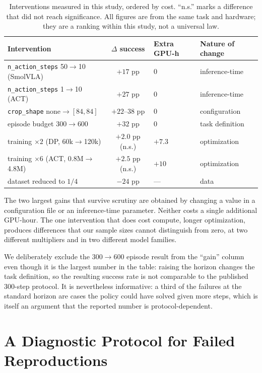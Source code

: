 \documentclass[11pt]{article}
\begin{document}
\begin{table}[t]
\centering
\caption{Interventions measured in this study, ordered by cost. ``n.s.'' marks a
difference that did not reach significance. All figures are from the same task and
hardware; they are a ranking within this study, not a universal law.}
\label{tab:cost}
\begin{tabular}{p{6.2cm}cp{2.2cm}p{3.0cm}}
\toprule
Intervention & $\Delta$ success & Extra GPU-h & Nature of change \\
\midrule
\texttt{n\_action\_steps} 50$\rightarrow$10 (SmolVLA) & $+17$ pp & 0 & inference-time \\
\texttt{n\_action\_steps} 1$\rightarrow$10 (ACT)      & $+27$ pp & 0 & inference-time \\
\texttt{crop\_shape} none$\rightarrow[84,84]$         & $+22$--$38$ pp & 0 & configuration \\
episode budget 300$\rightarrow$600                     & $+32$ pp & 0 & task definition \\
\midrule
training $\times2$ (DP, 60k$\rightarrow$120k)          & $+2.0$ pp (n.s.) & $+7.3$ & optimization \\
training $\times6$ (ACT, 0.8M$\rightarrow$4.8M)        & $+2.5$ pp (n.s.) & $+10$ & optimization \\
\midrule
dataset reduced to $1/4$                               & $-24$ pp & --- & data \\
\bottomrule
\end{tabular}
\end{table}

The two largest gains that survive scrutiny are obtained by changing a value in a
configuration file or an inference-time parameter. Neither costs a single
additional GPU-hour. The one intervention that does cost compute, longer
optimization, produces differences that our sample sizes cannot distinguish from
zero, at two different multipliers and in two different model families.

We deliberately exclude the 300$\rightarrow$600 episode result from the ``gain''
column even though it is the largest number in the table: raising the horizon
changes the task definition, so the resulting success rate is not comparable to the
published 300-step protocol. It is nevertheless informative: a third of the failures
at the standard horizon are cases the policy could have solved given more steps,
which is itself an argument that the reported number is protocol-dependent.

\section{A Diagnostic Protocol for Failed Reproductions}
\label{sec:protocol}
\end{document}
